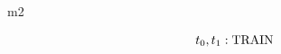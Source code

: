 \documentclass[12pt]{amsart}
\begin{document}
\begin{machine}{m2}


%
%
%
%
%
\begin{align*}
	t_0,t_1 : \text{TRAIN}
\end{align*}
%
%
%
%
%
%
%
%

\end{machine}
\end{document}
